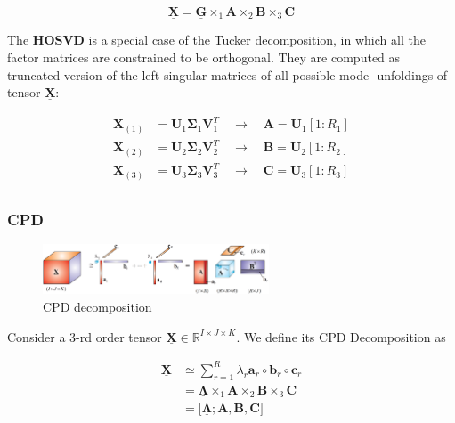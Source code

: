 \documentclass[../../main.tex]{subfiles}
\begin{document}
$$
\mathbf{\underline{X}} = \mathbf{\underline{G}} \times_1 \mathbf{A} \times_2 \mathbf{B} \times_3 \mathbf{C}
$$

The \textbf{HOSVD} is a special case of the Tucker decomposition, in which all the factor matrices are constrained to be orthogonal. They are computed as truncated version of the left singular matrices of all possible mode- unfoldings of tensor $\mathbf{\underline{X}}$:

\begin{equation}
\begin{aligned}
\mathbf{X}_{(1)} &= \mathbf{U}_1  \mathbf{\Sigma}_1 \mathbf{V}_1^T \quad \rightarrow \quad \mathbf{A} = \mathbf{U}_1[1:R_1]\\
\mathbf{X}_{(2)} &= \mathbf{U}_2  \mathbf{\Sigma}_2 \mathbf{V}_2^T \quad \rightarrow \quad \mathbf{B} = \mathbf{U}_2[1:R_2] \\
\mathbf{X}_{(3)} &= \mathbf{U}_3  \mathbf{\Sigma}_3 \mathbf{V}_3^T \quad \rightarrow \quad \mathbf{C} = \mathbf{U}_3[1:R_3] \\
\end{aligned}
\end{equation}

\break 

\subsubsection{CPD}

\begin{figure}[h!]
\centering
\includegraphics[width=0.6\textwidth]{figures/cpd_decomp}
\caption{CPD decomposition}
\label{fig:Lab1:2}
\end{figure}

Consider a 3-rd order tensor $\mathbf{\underline{X}} \in \mathbb{R}^{I \times J \times K}$. We define its CPD Decomposition as 

\begin{equation}
\begin{aligned}
\mathbf{\underline{X}} & \simeq \sum_{r=1}^{R} \lambda_r \mathbf{a}_r \circ \mathbf{b}_r \circ \mathbf{c}_r\\
& = \mathbf{\underline{\Lambda}} \times_1 \mathbf{A} \times_2 \mathbf{B} \times_3 \mathbf{C}\\
& = \Big[    \mathbf{\underline{\Lambda}} ;  \mathbf{A},  \mathbf{B}, \mathbf{C}      \Big]
\end{aligned}
\end{equation}
\end{document}
